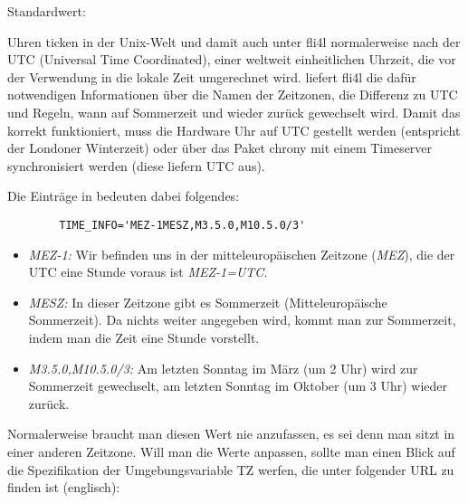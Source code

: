 \begin{description}

  Standardwert: 
  
  Uhren ticken in der Unix-Welt und damit auch unter fli4l
  normalerweise nach der UTC (Universal Time Coordinated), einer
  weltweit einheitlichen Uhrzeit, die vor der Verwendung in die lokale
  Zeit umgerechnet wird.  liefert fli4l die dafür
  notwendigen Informationen über die Namen der Zeitzonen, die
  Differenz zu UTC und Regeln, wann auf Sommerzeit und wieder zurück
  gewechselt wird. Damit das korrekt funktioniert, muss die Hardware
  Uhr auf UTC gestellt werden (entspricht der Londoner Winterzeit)
  oder über das Paket chrony mit einem Timeserver synchronisiert werden
  (diese liefern UTC aus).

  Die Einträge in  bedeuten dabei folgendes:
  \begin{example}
    \begin{verbatim}
        TIME_INFO='MEZ-1MESZ,M3.5.0,M10.5.0/3'
    \end{verbatim}
  \end{example}
  \begin{itemize}
    \item \emph{MEZ-1:} Wir befinden uns in der mitteleuropäischen
      Zeitzone (\emph{MEZ}), die der UTC eine Stunde voraus ist \emph{MEZ-1=UTC}.
    \item \emph{MESZ:} In dieser Zeitzone gibt es Sommerzeit
      (Mitteleuropäische Sommerzeit). Da nichts weiter angegeben wird,
      kommt man zur Sommerzeit, indem man die Zeit eine Stunde
      vorstellt.
    \item \emph{M3.5.0,M10.5.0/3:} Am letzten Sonntag im März (um 2 Uhr) wird
      zur Sommerzeit gewechselt, am letzten Sonntag im Oktober (um 3 Uhr)
      wieder zurück.
  \end{itemize}

  Normalerweise braucht man diesen Wert nie anzufassen, es sei denn
  man sitzt in einer anderen Zeitzone. Will man die Werte anpassen,
  sollte man einen Blick auf die Spezifikation der Umgebungsvariable
  TZ werfen, die unter folgender URL zu finden ist (englisch):

\end{description}
